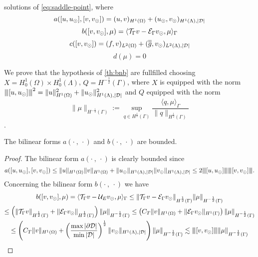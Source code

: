 solutions of \eqref{eq:saddle-point}, where
\begin{equation*}
a([u, u_{\odot}], [v, v_{\odot}])= (u,v)_{H^1(\Omega)} + (u_{\odot},v_{\odot})_{H^1(\Lambda),|\mathcal{D}|}
\end{equation*} 
\begin{equation*}
b([v, v_{\odot}], \mu)= \langle {\mathcal{T}_\Gamma} v - \mathcal{E}_\Gamma v_{\odot} , \mu \rangle_\Gamma
\end{equation*} 
\begin{equation*}
c([v,v_{\odot}])= (f,v)_{L^2(\Omega)} + (\overline{\overline{g}},v_{\odot})_{L^2(\Lambda),|\mathcal{D}|}
\end{equation*}
\begin{equation*}
d(\mu)=0
\end{equation*}

We prove that the hypothesis of \ref{th:bnb} are fullfilled choosing 
$X=H^1_0(\Omega) \times H^1_0(\Lambda)$, $Q=H^{-\frac 12}(\Gamma)$, where $X$  is equipped with the norm ${\left\vert\kern-0.25ex\left\vert\kern-0.25ex\left\vert [u,u_{\odot} ] \right\vert\kern-0.25ex\right\vert\kern-0.25ex\right\vert}^2=\|u\|^2_{H^1(\Omega)} + \|u_{\odot}\|^2_{H^1(\Lambda),|\mathcal{D}|}$ and $Q$ equipped with the norm
\begin{equation*}
\|\mu \|_{H^{-\frac 12}(\Gamma)} := \sup_{q\in H^{\frac 12}(\Gamma)}\frac{\langle q, \mu\rangle_\Gamma}{\|q\|_{H^{\frac 12}(\Gamma)}}
\end{equation*}. 
\begin{lemma}\label{lemma:prob1_boundedness} 
The bilinear forms $a(\cdot \ , \ \cdot)$ and $b(\cdot \ , \ \cdot)$ are bounded.
\end{lemma}
\begin{proof}
The bilinear form $a(\cdot \ , \ \cdot)$ is clearly bounded since
\begin{equation*}
a([u, u_{\odot}], [v, v_{\odot}])\leq \|u\|_{H^1(\Omega)}\|v\|_{H^1(\Omega)} + \|u_{\odot}\|_{H^1(\Lambda), |\mathcal{D}|}\|v_{\odot}\|_{H^1(\Lambda), |\mathcal{D}|} \leq 2 {\left\vert\kern-0.25ex\left\vert\kern-0.25ex\left\vert [u, u_{\odot}] \right\vert\kern-0.25ex\right\vert\kern-0.25ex\right\vert}{\left\vert\kern-0.25ex\left\vert\kern-0.25ex\left\vert [v, v_{\odot}] \right\vert\kern-0.25ex\right\vert\kern-0.25ex\right\vert}.
\end{equation*}
Concerning the bilinear form $b(\cdot \ , \ \cdot)$ we have
\begin{multline*}
b([v, v_{\odot}], \mu)= \langle {\mathcal{T}_\Gamma} v - \mathcal{U}_E v_{\odot} , \mu \rangle_\Gamma 
\leq \|{\mathcal{T}_\Gamma} v - \mathcal{E}_\Gamma v_{\odot}\|_{H^{\frac 12}(\Gamma)}\|\mu\|_{H^{-\frac 12}(\Gamma)}\\
\leq \left(\|{\mathcal{T}_\Gamma} v\|_{H^{\frac 12}(\Gamma)} + \|\mathcal{E}_\Gamma v_{\odot}\|_{H^{\frac 12}(\Gamma)}\right)\|\mu\|_{H^{-\frac 12}(\Gamma)}
\leq \left(C_T \|v\|_{H^1(\Omega)} + \|\mathcal{E}_\Gamma v_{\odot}\|_{H^1(\Gamma)}\right)\|\mu\|_{H^{-\frac 12}(\Gamma)}\\
\leq \left(C_T \|v\|_{H^1(\Omega)} + \left(\frac{\max |\partial\mathcal{D}|}{\min |\mathcal{D}|}\right)^{\frac 12} \|v_{\odot}\|_{H^1(\Lambda),|\mathcal{D}|}\right)\|\mu\|_{H^{-\frac 12}(\Gamma)}
\lesssim {\left\vert\kern-0.25ex\left\vert\kern-0.25ex\left\vert [v,v_{\odot}] \right\vert\kern-0.25ex\right\vert\kern-0.25ex\right\vert}\|\mu\|_{H^{-\frac 12}(\Gamma)}
\end{multline*}
\end{proof}

